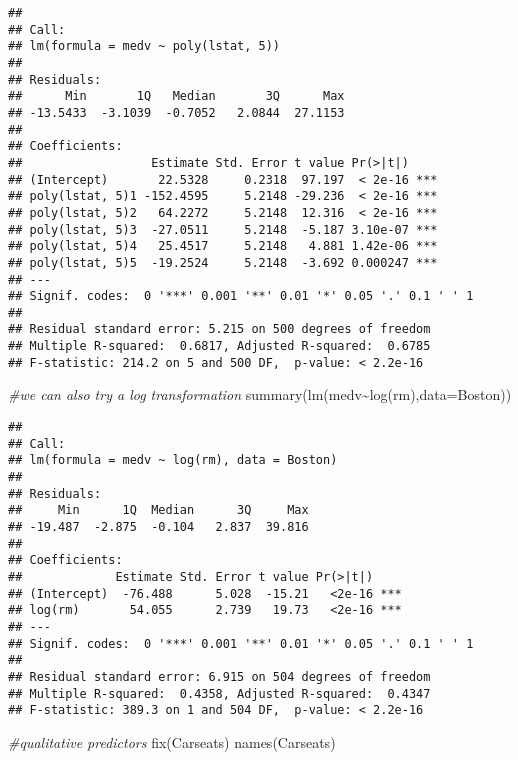 \documentclass[
]{article}
\newenvironment{Shaded}{\begin{snugshade}}{\end{snugshade}}
\newcommand{\AttributeTok}[1]{\textcolor[rgb]{0.77,0.63,0.00}{#1}}
\newcommand{\CommentTok}[1]{\textcolor[rgb]{0.56,0.35,0.01}{\textit{#1}}}
\newcommand{\FunctionTok}[1]{\textcolor[rgb]{0.00,0.00,0.00}{#1}}
\newcommand{\NormalTok}[1]{#1}
\newcommand{\SpecialCharTok}[1]{\textcolor[rgb]{0.00,0.00,0.00}{#1}}
\begin{document}
\begin{verbatim}
## 
## Call:
## lm(formula = medv ~ poly(lstat, 5))
## 
## Residuals:
##      Min       1Q   Median       3Q      Max 
## -13.5433  -3.1039  -0.7052   2.0844  27.1153 
## 
## Coefficients:
##                  Estimate Std. Error t value Pr(>|t|)    
## (Intercept)       22.5328     0.2318  97.197  < 2e-16 ***
## poly(lstat, 5)1 -152.4595     5.2148 -29.236  < 2e-16 ***
## poly(lstat, 5)2   64.2272     5.2148  12.316  < 2e-16 ***
## poly(lstat, 5)3  -27.0511     5.2148  -5.187 3.10e-07 ***
## poly(lstat, 5)4   25.4517     5.2148   4.881 1.42e-06 ***
## poly(lstat, 5)5  -19.2524     5.2148  -3.692 0.000247 ***
## ---
## Signif. codes:  0 '***' 0.001 '**' 0.01 '*' 0.05 '.' 0.1 ' ' 1
## 
## Residual standard error: 5.215 on 500 degrees of freedom
## Multiple R-squared:  0.6817, Adjusted R-squared:  0.6785 
## F-statistic: 214.2 on 5 and 500 DF,  p-value: < 2.2e-16
\end{verbatim}

\begin{Shaded}
\begin{Highlighting}[]
\CommentTok{\#we can also try a log transformation}
\FunctionTok{summary}\NormalTok{(}\FunctionTok{lm}\NormalTok{(medv}\SpecialCharTok{\textasciitilde{}}\FunctionTok{log}\NormalTok{(rm),}\AttributeTok{data=}\NormalTok{Boston))}
\end{Highlighting}
\end{Shaded}

\begin{verbatim}
## 
## Call:
## lm(formula = medv ~ log(rm), data = Boston)
## 
## Residuals:
##     Min      1Q  Median      3Q     Max 
## -19.487  -2.875  -0.104   2.837  39.816 
## 
## Coefficients:
##             Estimate Std. Error t value Pr(>|t|)    
## (Intercept)  -76.488      5.028  -15.21   <2e-16 ***
## log(rm)       54.055      2.739   19.73   <2e-16 ***
## ---
## Signif. codes:  0 '***' 0.001 '**' 0.01 '*' 0.05 '.' 0.1 ' ' 1
## 
## Residual standard error: 6.915 on 504 degrees of freedom
## Multiple R-squared:  0.4358, Adjusted R-squared:  0.4347 
## F-statistic: 389.3 on 1 and 504 DF,  p-value: < 2.2e-16
\end{verbatim}

\begin{Shaded}
\begin{Highlighting}[]
\CommentTok{\#qualitative predictors}
\FunctionTok{fix}\NormalTok{(Carseats)}
\FunctionTok{names}\NormalTok{(Carseats)}
\end{Highlighting}
\end{Shaded}
\end{document}
